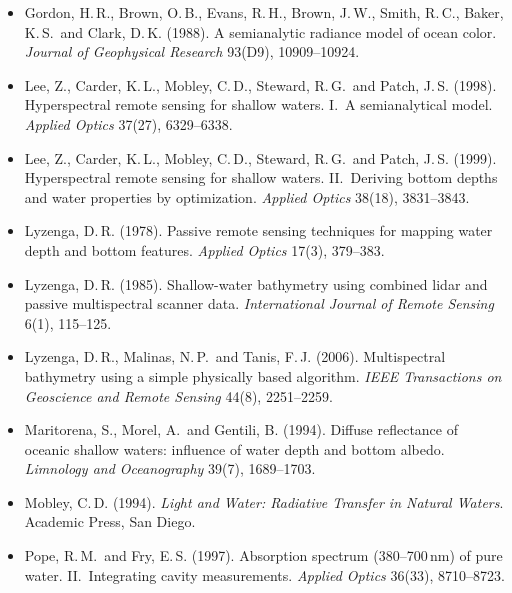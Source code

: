 \documentclass[11pt]{article}
\numberwithin{equation}{section}
\begin{document}
\begin{itemize}
\item Gordon, H.\,R., Brown, O.\,B., Evans, R.\,H., Brown, J.\,W., Smith, R.\,C., Baker, K.\,S.\ and
  Clark, D.\,K. (1988). A semianalytic radiance model of ocean color. \textit{Journal of
  Geophysical Research} 93(D9), 10909--10924.
\item Lee, Z., Carder, K.\,L., Mobley, C.\,D., Steward, R.\,G.\ and Patch, J.\,S. (1998).
  Hyperspectral remote sensing for shallow waters. I.\ A semianalytical model. \textit{Applied
  Optics} 37(27), 6329--6338.
\item Lee, Z., Carder, K.\,L., Mobley, C.\,D., Steward, R.\,G.\ and Patch, J.\,S. (1999).
  Hyperspectral remote sensing for shallow waters. II.\ Deriving bottom depths and water
  properties by optimization. \textit{Applied Optics} 38(18), 3831--3843.
\item Lyzenga, D.\,R. (1978). Passive remote sensing techniques for mapping water depth and
  bottom features. \textit{Applied Optics} 17(3), 379--383.
\item Lyzenga, D.\,R. (1985). Shallow-water bathymetry using combined lidar and passive
  multispectral scanner data. \textit{International Journal of Remote Sensing} 6(1), 115--125.
\item Lyzenga, D.\,R., Malinas, N.\,P.\ and Tanis, F.\,J. (2006). Multispectral bathymetry using a
  simple physically based algorithm. \textit{IEEE Transactions on Geoscience and Remote Sensing}
  44(8), 2251--2259.
\item Maritorena, S., Morel, A.\ and Gentili, B. (1994). Diffuse reflectance of oceanic shallow
  waters: influence of water depth and bottom albedo. \textit{Limnology and Oceanography} 39(7),
  1689--1703.
\item Mobley, C.\,D. (1994). \textit{Light and Water: Radiative Transfer in Natural Waters}.
  Academic Press, San Diego.
\item Pope, R.\,M.\ and Fry, E.\,S. (1997). Absorption spectrum (380--700\,nm) of pure water.
  II.\ Integrating cavity measurements. \textit{Applied Optics} 36(33), 8710--8723.
\end{itemize}
\end{document}

